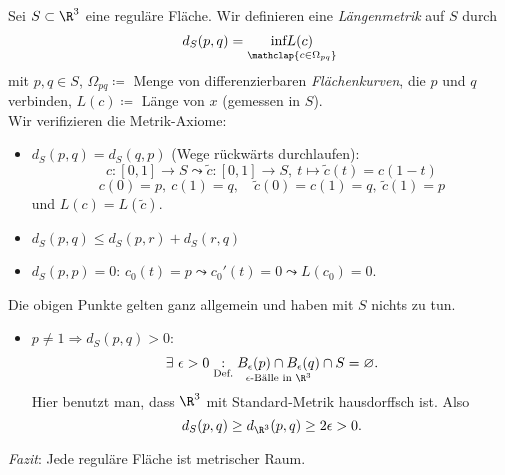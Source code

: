\begin{remark}[Reguläre Fläche = Metrischer Raum]
  Sei $ S \subset \R^3 $ eine reguläre Fläche. Wir definieren eine \emph{Längenmetrik} auf $ S $ durch
  \begin{equation*}
    d_S(p,q) = \underset{\mathclap{\substack{c \in \Omega_{pq}}}}{\text{inf}L(c)}
  \end{equation*}
  mit $ p,q \in S $, $ \Omega_{pq} \coloneqq $ Menge von differenzierbaren \emph{Flächenkurven}, die $ p $ und $ q $ verbinden, $ L(c) \coloneqq $ Länge von $ x $ (gemessen in $ S $).
  \\
  Wir verifizieren die Metrik-Axiome:
  \begin{itemize}
    \item $ d_S(p,q) = d_S(q,p) $ (Wege rückwärts durchlaufen):
    \begin{equation*}
       c: [0,1] \to S \leadsto \tilde{c}: [0,1] \to S, \ t \mapsto \tilde{c}(t) = c(1-t)
     \end{equation*} 
     \begin{equation*}
       c(0) = p, \ c(1) = q, \quad \tilde{c}(0) = c(1) = q, \ \tilde{c}(1) = p
     \end{equation*}
     und $ L(c) = L(\tilde{c}) $.

    \item $ d_S(p,q) \leq d_S(p,r) + d_S(r,q) $
    \item $ d_S(p,p) = 0 $: $ c_0(t) = p \leadsto c_0'(t) = 0 \leadsto L(c_0) = 0 $.
  \end{itemize}
  Die obigen Punkte gelten ganz allgemein und haben mit $ S $ nichts zu tun.
  \begin{itemize}
    \item $ p \neq 1 \Rightarrow d_S(p,q) > 0 $:
    \begin{equation*}
       \exists \ \epsilon > 0 \underset{\text{Def.}}{:} \underset{\epsilon\text{-Bälle in } \R^3}{B_\epsilon(p) \cap B_\epsilon(q)} \cap S = \varnothing\text{.}
     \end{equation*} 
     Hier benutzt man, dass $ \R^3 $ mit Standard-Metrik hausdorffsch ist. Also
     \begin{equation*}
       d_S(p,q) \geq d_{\R^3}(p,q) \geq 2\epsilon > 0\text{.}
     \end{equation*}
  \end{itemize}
  \emph{Fazit}: Jede reguläre Fläche ist metrischer Raum.
\end{remark}

